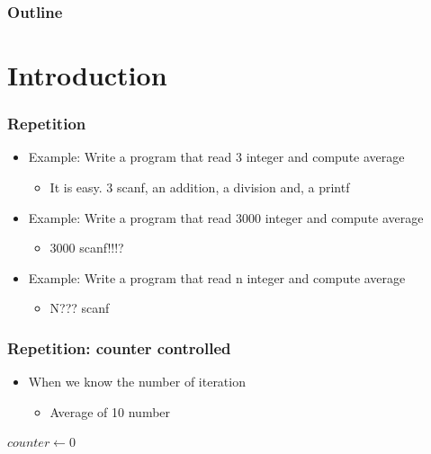 \documentclass{../c-lecture}
\subtitle{Repeating Statements}
\begin{document}
\begin{frame}
  \titlepage{}
\end{frame}
\begin{frame}
  \frametitle{Outline}
  \tableofcontents{}
\end{frame}

\section{Introduction}

\begin{frame}
  \frametitle{Repetition}
  \begin{itemize}
    \item Example: Write a program that read 3 integer and compute average
    \begin{itemize}
      \item It is easy. 3 scanf, an addition, a division and, a printf
    \end{itemize}
    \item Example: Write a program that read 3000 integer and compute average
    \begin{itemize}
      \item 3000 scanf!!!?
    \end{itemize}
    \item Example: Write a program that read n integer and compute average
    \begin{itemize}
      \item N??? scanf
    \end{itemize}
  \end{itemize}
\end{frame}

\begin{frame}
  \frametitle{Repetition: counter controlled}
  \begin{itemize}
    \item When we know the number of iteration
    \begin{itemize}
      \item Average of 10 number
    \end{itemize}
  \end{itemize}
  \begin{algorithm}[H]
  \KwData{}
  \KwResult{}
  $counter \gets 0$\;

  \end{algorithm}
\end{frame}
\end{document}

